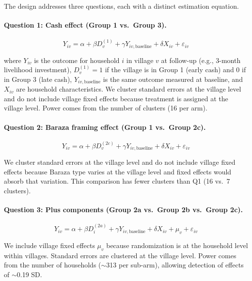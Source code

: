 \documentclass[12pt, oneside]{amsart}
\numberwithin{equation}{section}
\begin{document}
The design addresses three questions, each with a distinct estimation equation.

\paragraph{Question 1: Cash effect (Group 1 vs.\ Group 3).}

\begin{equation}
Y_{iv} = \alpha + \beta D_v^{(1)} + \gamma Y_{iv,\text{baseline}} + \delta X_{iv} + \varepsilon_{iv}
\end{equation}

\noindent where $Y_{iv}$ is the outcome for household $i$ in village $v$ at follow-up (e.g., 3-month livelihood investment), $D_v^{(1)} = 1$ if the village is in Group 1 (early cash) and 0 if in Group 3 (late cash), $Y_{iv,\text{baseline}}$ is the same outcome measured at baseline, and $X_{iv}$ are household characteristics. We cluster standard errors at the village level and do not include village fixed effects because treatment is assigned at the village level. Power comes from the number of clusters (16 per arm).

\paragraph{Question 2: Baraza framing effect (Group 1 vs.\ Group 2c).}

\begin{equation}
Y_{iv} = \alpha + \beta D_v^{(2c)} + \gamma Y_{iv,\text{baseline}} + \delta X_{iv} + \varepsilon_{iv}
\end{equation}

\noindent We cluster standard errors at the village level and do not include village fixed effects because Baraza type varies at the village level and fixed effects would absorb that variation. This comparison has fewer clusters than Q1 (16 vs.\ 7 clusters).

\paragraph{Question 3: Plus components (Group 2a vs.\ Group 2b vs.\ Group 2c).}

\begin{equation}
Y_{iv} = \alpha + \beta D_{i}^{(2a)} + \gamma Y_{iv,\text{baseline}} + \delta X_{iv} + \mu_v + \varepsilon_{iv}
\end{equation}

\noindent We include village fixed effects $\mu_v$ because randomization is at the household level within villages. Standard errors are clustered at the village level. Power comes from the number of households ($\sim$313 per sub-arm), allowing detection of effects of $\sim$0.19 SD.
\end{document}
